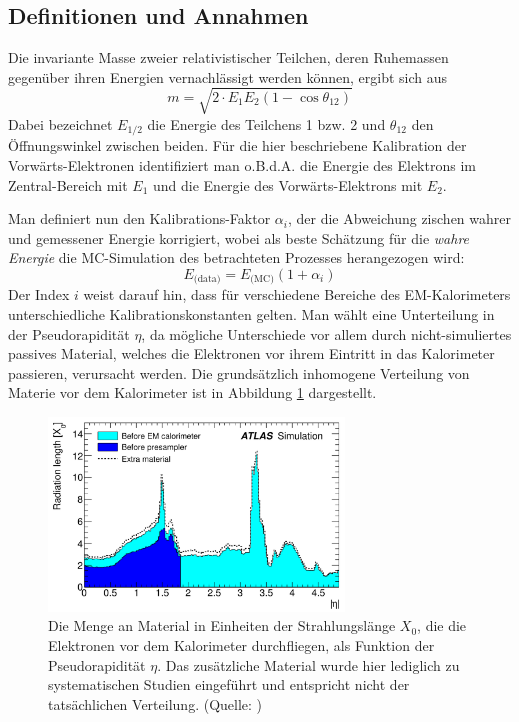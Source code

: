\subsection{Definitionen und Annahmen}
\label{energy_calibration:definitionen_und_annahmen}

Die invariante Masse zweier relativistischer Teilchen, deren Ruhemassen
gegenüber ihren Energien vernachlässigt werden können, ergibt sich aus
\begin{equation}
    \label{invariant_mass:basic}
    m = \sqrt{ 2 \cdot E_1 E_2 (1-\cos\theta_{12}) }
\end{equation}
Dabei bezeichnet $E_{1/2}$ die Energie des Teilchens 1 bzw. 2 und $\theta_{12}$
den Öffnungswinkel zwischen beiden. Für die hier beschriebene Kalibration der
Vorwärts-Elektronen identifiziert man o.B.d.A. die Energie des Elektrons im
Zentral-Bereich mit $E_1$ und die Energie des Vorwärts-Elektrons mit $E_2$.

Man definiert nun den Kalibrations-Faktor $\alpha_i$, der die Abweichung
zischen wahrer und gemessener Energie korrigiert, wobei als beste Schätzung für
die \textit{wahre Energie} die \acs{MC}-Simulation des betrachteten Prozesses
herangezogen wird:
\begin{equation}
    \label{definition:energy_scale}
    E_\text{(data)} = E_\text{(MC)} (1+\alpha_i)
\end{equation}
Der Index $i$ weist darauf hin, dass für verschiedene Bereiche des
EM-Kalorimeters unterschiedliche Kalibrationskonstanten gelten. Man wählt eine
Unterteilung in der Pseudorapidität $\eta$, da mögliche Unterschiede vor allem
durch nicht-simuliertes passives Material, welches die Elektronen vor ihrem 
Eintritt in das Kalorimeter passieren, verursacht werden. Die grundsätzlich
inhomogene Verteilung von Materie vor dem Kalorimeter ist in Abbildung
\ref{fig:extra_material} dargestellt.

\begin{figure}
    \centering
    \includegraphics[width=0.7\textwidth]{img/extra_material}
    \caption[Material vor dem EM-Kalorimeter]
        {Die Menge an Material in Einheiten der Strahlungslänge $X_0$, die die
        Elektronen vor dem Kalorimeter durchfliegen, als Funktion der 
        Pseudorapidität $\eta$. Das zusätzliche Material wurde hier lediglich 
        zu systematischen Studien eingeführt und entspricht nicht der 
        tatsächlichen Verteilung. (Quelle: \cite{Aad:2011mk})}
    \label{fig:extra_material}
\end{figure}

